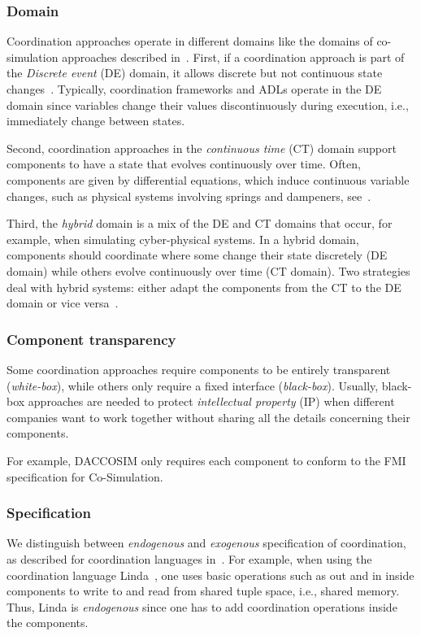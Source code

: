 \documentclass[runningheads]{llncs}
\begin{document}
\subsubsection{Domain} Coordination approaches operate in different domains like the domains of co-simulation approaches described in~\cite{gomesCoSimulationSurvey2019}.
First, if a coordination approach is part of the \textit{Discrete event} (DE) domain, it allows discrete but not continuous state changes~\cite{gomesCoSimulationSurvey2019}.
Typically, coordination frameworks and ADLs operate in the DE domain since variables change their values discontinuously during execution, i.e., immediately change between states.

Second, coordination approaches in the \textit{continuous time} (CT) domain support components to have a state that evolves continuously over time.
Often, components are given by differential equations, which induce continuous variable changes, such as physical systems involving springs and dampeners, see~\cite{gomesCoSimulationSurvey2019}.

Third, the \textit{hybrid} domain is a mix of the DE and CT domains that occur, for example, when simulating cyber-physical systems.
In a hybrid domain, components should coordinate where some change their state discretely (DE domain) while others evolve continuously over time (CT domain).
Two strategies deal with hybrid systems: either adapt the components from the CT to the DE domain or vice versa~\cite{gomesCoSimulationSurvey2019}.

\subsubsection{Component transparency} Some coordination approaches require components to be entirely transparent (\textit{white-box}), while others only require a fixed interface (\textit{black-box}).
Usually, black-box approaches are needed to protect \textit{intellectual property} (IP) when different companies want to work together without sharing all the details concerning their components.

For example, DACCOSIM only requires each component to conform to the FMI specification for Co-Simulation.

\subsubsection{Specification} We distinguish between \textit{endogenous} and \textit{exogenous} specification of coordination, as described for coordination languages in~\cite{arbabWhatYouMean1998}.
For example, when using the coordination language Linda~\cite{carrieroLindaContext1989}, one uses basic operations such as \textsf{out} and \textsf{in} inside components to write to and read from shared tuple space, i.e., shared memory.
Thus, Linda is \textit{endogenous} since one has to add coordination operations inside the components.
\end{document}
